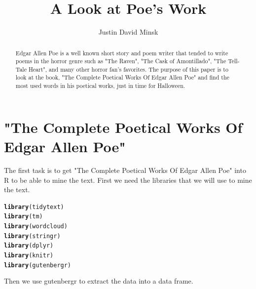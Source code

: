 \documentclass{article}\usepackage[]{graphicx}\usepackage[]{color}
\makeatletter
\newcommand{\hlstd}[1]{\textcolor[rgb]{0.345,0.345,0.345}{#1}}%
\newcommand{\hlkwd}[1]{\textcolor[rgb]{0.737,0.353,0.396}{\textbf{#1}}}%
\newenvironment{kframe}{%
 \def\at@end@of@kframe{}%
 \ifinner\ifhmode%
  \def\at@end@of@kframe{\end{minipage}}%
  \begin{minipage}{\columnwidth}%
 \fi\fi%
 \def\FrameCommand##1{\hskip\@totalleftmargin \hskip-\fboxsep
 \colorbox{shadecolor}{##1}\hskip-\fboxsep
     \hskip-\linewidth \hskip-\@totalleftmargin \hskip\columnwidth}%
 \MakeFramed {\advance\hsize-\width
   \@totalleftmargin\z@ \linewidth\hsize
   \@setminipage}}%
 {\par\unskip\endMakeFramed%
 \at@end@of@kframe}
\newenvironment{knitrout}{}{} %
\makeatother
\begin{document}
\title{A Look at Poe's Work}
\author{Justin David Minsk}
\maketitle

\begin{abstract}
Edgar Allen Poe is a well known short story and poem writer that tended to write poems in the horror genre such as "The Raven", "The Cask of Amontillado", "The Tell-Tale Heart", and many other horror fan's favorites. The purpose of this paper is to look at the book, "The Complete Poetical Works Of Edgar Allen Poe" and find the most used words in his poetical works, just in time for Halloween.
\end{abstract}

\section{"The Complete Poetical Works Of Edgar Allen Poe"}
The first task is to get "The Complete Poetical Works Of Edgar Allen Poe" into R to be able to mine the text. First we need the libraries that we will use to mine the text.

\begin{knitrout}
\color{fgcolor}\begin{kframe}
\begin{alltt}
\hlkwd{library}\hlstd{(tidytext)}
\hlkwd{library}\hlstd{(tm)}
\hlkwd{library}\hlstd{(wordcloud)}
\hlkwd{library}\hlstd{(stringr)}
\hlkwd{library}\hlstd{(dplyr)}
\hlkwd{library}\hlstd{(knitr)}
\hlkwd{library}\hlstd{(gutenbergr)}
\end{alltt}
\end{kframe}
\end{knitrout}

\noindent Then we use gutenbergr to extract the data into a data frame.
\end{document}
